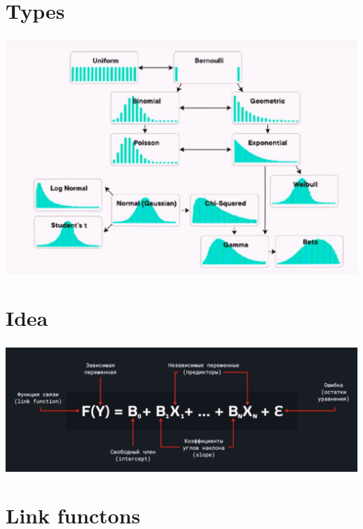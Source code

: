 \documentclass[t, 11pt]{beamer}
\begin{document}
\section{Types}

\begin{frame} 
	\frametitle{\insertsection} 
	\begin{center}
		\includegraphics[scale=0.3]{varaity}
	\end{center}
\end{frame}	

\section{Idea}

\begin{frame} 
	\frametitle{\insertsection} 
	\begin{center}
		\includegraphics[scale=0.23]{formula}
	\end{center}
\end{frame}	
	
\section{Link functons}
	
\end{document}

